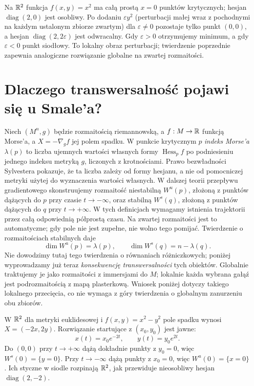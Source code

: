 \begin{przyklad}
Na $\mathbb{R}^2$ funkcja $f(x,y)=x^2$ ma całą prostą
$x=0$ punktów krytycznych; hesjan
$\operatorname{diag}(2,0)$ jest osobliwy.
Po dodaniu $\varepsilon y^2$ (perturbacji małej wraz
z pochodnymi na każdym ustalonym zbiorze zwartym) dla
$\varepsilon\ne0$ pozostaje tylko punkt
$(0,0)$, a hesjan
$\operatorname{diag}(2,2\varepsilon)$
jest odwracalny. Gdy $\varepsilon>0$
otrzymujemy minimum, a gdy
$\varepsilon<0$ punkt siodłowy.
To lokalny obraz perturbacji; twierdzenie
poprzednie zapewnia analogiczne
rozwiązanie globalne na zwartej rozmaitości.
\end{przyklad}

\section{Dlaczego transwersalność pojawi się u Smale'a?}
\label{sec:transwersalnosc-smale}

Niech $(M^n,g)$ będzie rozmaitością riemannowską,
a $f:M\to\mathbb{R}$ funkcją Morse'a,
a $X=-\nabla_g f$ jej polem spadku. W punkcie
krytycznym $p$ \emph{indeks Morse'a}
$\lambda(p)$ to liczba ujemnych wartości
własnych formy $\operatorname{Hess}_p f$
po podniesieniu jednego indeksu metryką $g$,
liczonych z krotnościami. Prawo bezwładności Sylvestera
pokazuje, że ta liczba zależy od formy hesjanu,
a nie od pomocniczej metryki użytej do wyznaczenia
wartości własnych. W dalszej teorii
przepływu gradientowego skonstruujemy
rozmaitość niestabilną $W^u(p)$, złożoną
z punktów dążących do $p$ przy czasie
$t\to-\infty$, oraz stabilną $W^s(q)$,
złożoną z punktów dążących do $q$
przy $t\to+\infty$. W tych definicjach wymagamy
istnienia trajektorii przez całą odpowiednią półprostą
czasu. Na zwartej rozmaitości jest to automatyczne;
gdy pole nie jest zupełne, nie wolno tego pomijać.
Twierdzenie o
rozmaitościach stabilnych daje
\[
 \dim W^u(p)=\lambda(p),\qquad
 \dim W^s(q)=n-\lambda(q).
\]
Nie dowodzimy tutaj tego twierdzenia o równaniach
różniczkowych; poniżej wyprowadzamy już teraz
\emph{konsekwencję transwersalności} tych obiektów.
Globalnie traktujemy je jako rozmaitości z immersjami
do $M$; lokalnie każda wybrana gałąź jest podrozmaitością
z mapą plasterkową. Wniosek poniżej dotyczy takiego
lokalnego przecięcia, co nie wymaga z góry twierdzenia
o globalnym zanurzeniu obu zbiorów.

\begin{przyklad}
\label{prz:siodlo-transwersalne}
W $\mathbb{R}^2$ dla metryki euklidesowej i
$f(x,y)=x^2-y^2$ pole spadku wynosi
$X=(-2x,2y)$. Rozwiązanie startujące z
$(x_0,y_0)$ jest jawne:
\[
 x(t)=x_0e^{-2t},\qquad y(t)=y_0e^{2t}.
\]
Do $(0,0)$ przy $t\to+\infty$ dążą dokładnie
punkty z $y_0=0$, więc
$W^s(0)=\{y=0\}$. Przy $t\to-\infty$
dążą punkty z $x_0=0$, więc
$W^u(0)=\{x=0\}$. Ich styczne w siodle
rozpinają $\mathbb{R}^2$, jak przewiduje
nieosobliwy hesjan $\operatorname{diag}(2,-2)$.
\end{przyklad}

